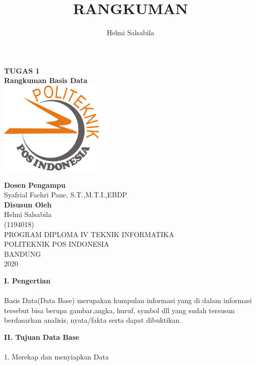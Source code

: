 \documentclass[a4paper,12pt]{article}
\title{RANGKUMAN}
\author{Helmi Salsabila}
\begin{document}
	\begin{center}
			\textbf{TUGAS 1}\\
		\vspace{0.4cm}
			\textbf {Rangkuman Basis Data}\\
		\vspace{1cm}
			\includegraphics [width=5cm] {logo.png}
		
		\vspace{1cm}
			\textbf{Dosen Pengampu}\\
				Syafrial Fachri Pane, S.T.,M.T.I.,EBDP\\

		\vspace{0.4cm}
			\textbf{Disusun Oleh}\\
				Helmi Salsabila\\(1194018)
		\vspace{3cm}
		\\PROGRAM DIPLOMA IV TEKNIK INFORMATIKA\\POLITEKNIK POS INDONESIA\\BANDUNG\\2020 

\newpage
\end{center}

		\textbf{I. Pengertian}
	\vspace{-0.3cm}
		\paragraph{}
				Basis Data(Data Base) merupakan kumpulan informasi yang di dalam informasi tersebut bisa berupa 		 gambar,angka, huruf, symbol dll yang sudah tersusun berdasarkan analisis, nyata/fakta serta dapat dibuktikan.

	\vspace{0.8cm}
		\textbf{II. Tujuan Data Base}
		\paragraph{}
\vspace{-0.3cm}
			1.	Merekap dan menyiapkan Data\\
\vspace{-1cm}
\end{document}
